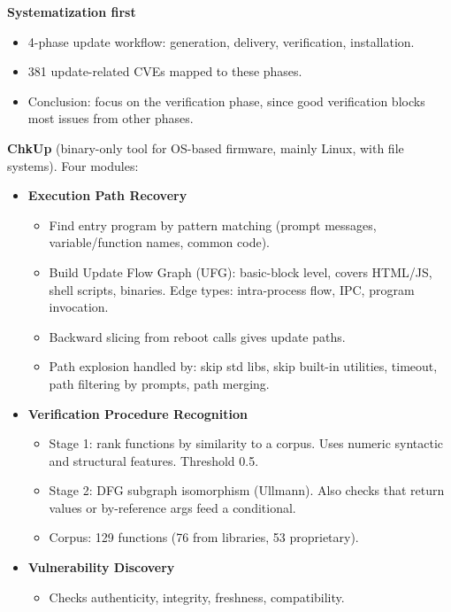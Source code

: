 \documentclass[11pt,a4paper]{article}
\begin{document}
\begin{enumerate}
    \textbf{Systematization first}
    \begin{itemize}
        \item 4-phase update workflow: generation, delivery, verification, installation.
        \item 381 update-related CVEs mapped to these phases.
        \item Conclusion: focus on the verification phase, since good verification blocks most issues from other phases.
    \end{itemize}

    \textbf{ChkUp} (binary-only tool for OS-based firmware, mainly Linux, with file systems). Four modules:

    \begin{itemize}
        \item \textbf{Execution Path Recovery}
        \begin{itemize}
            \item Find entry program by pattern matching (prompt messages, variable/function names, common code).
            \item Build Update Flow Graph (UFG): basic-block level, covers HTML/JS, shell scripts, binaries. Edge types: intra-process flow, IPC, program invocation.
            \item Backward slicing from reboot calls gives update paths.
            \item Path explosion handled by: skip std libs, skip built-in utilities, timeout, path filtering by prompts, path merging.
        \end{itemize}
        \item \textbf{Verification Procedure Recognition}
        \begin{itemize}
            \item Stage 1: rank functions by similarity to a corpus. Uses numeric syntactic and structural features. Threshold 0.5.
            \item Stage 2: DFG subgraph isomorphism (Ullmann). Also checks that return values or by-reference args feed a conditional.
            \item Corpus: 129 functions (76 from libraries, 53 proprietary).
        \end{itemize}
        \item \textbf{Vulnerability Discovery}
        \begin{itemize}
            \item Checks authenticity, integrity, freshness, compatibility.

\end{itemize}
\end{itemize}
\end{enumerate}
\end{document}
